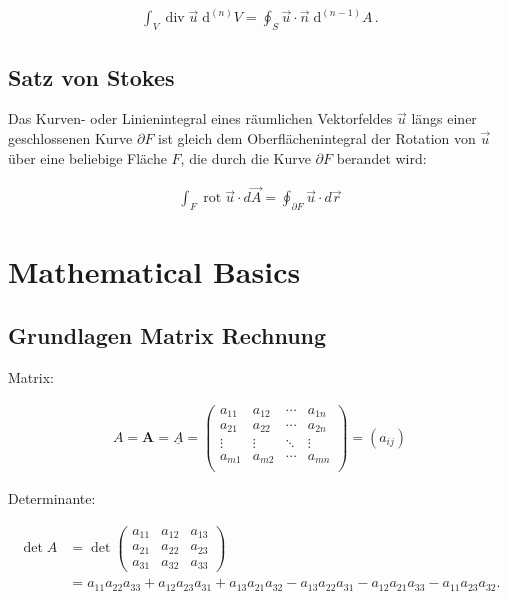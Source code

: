 \documentclass[a4paper]{scrartcl}
\begin{document}
\begin{align}
\int_V \operatorname{div} \vec u \; \mathrm d^{(n)}V = \oint_{S} \vec u \cdot
\vec n\; \mathrm d^{(n-1)}A\,.
\end{align}
\subsection{Satz von Stokes}
Das Kurven- oder Linienintegral eines räumlichen Vektorfeldes $\vec u$ längs
einer geschlossenen Kurve $\partial F$ ist gleich dem Oberflächenintegral der
Rotation von $\vec u$ über eine beliebige Fläche $F$, die durch die Kurve
$\partial F$ berandet wird:

\begin{align}
 \int_{F} \operatorname{rot} \vec u \cdot d \vec A =
\oint_{\partial F} \vec u \cdot d \vec r
\end{align}


\section{Mathematical Basics}
\subsection{Grundlagen Matrix Rechnung}

Matrix:

\begin{align}
A=\mathbf{A}=\underline{A}=\begin{pmatrix} a_{11} & a_{12} & \cdots & a_{1n}\\
a_{21} & a_{22} & \cdots & a_{2n}\\ \vdots & \vdots & \ddots & \vdots\\ a_{m1}
& a_{m2} & \cdots & a_{mn}\\ \end{pmatrix} = (a_{ij})
\end{align}

Determinante:

\begin{align} \det A &= \det \begin{pmatrix} a_{11} & a_{12} & a_{13} \\ a_{21}
& a_{22} & a_{23} \\ a_{31} & a_{32} & a_{33} \end{pmatrix} \\ &= a_{11} a_{22}
a_{33} +a_{12} a_{23} a_{31} + a_{13} a_{21} a_{32} - a_{13} a_{22} a_{31} -
a_{12} a_{21} a_{33} - a_{11} a_{23} a_{32}. \end{align}
\end{document}
